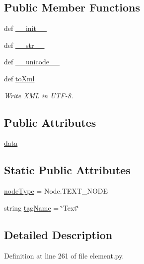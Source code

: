 \subsection*{Public Member Functions}
\begin{DoxyCompactItemize}
\item 
def \hyperlink{classodf_1_1element_1_1Text_a022dd0dc36f3ad61dfa1a497a15e7778}{\+\_\+\+\_\+init\+\_\+\+\_\+}
\item 
def \hyperlink{classodf_1_1element_1_1Text_ad8981ca5661cb6ddf5b3ec460d429850}{\+\_\+\+\_\+str\+\_\+\+\_\+}
\item 
def \hyperlink{classodf_1_1element_1_1Text_add3e46b75b09f55d21ad8a9c129fb7be}{\+\_\+\+\_\+unicode\+\_\+\+\_\+}
\item 
def \hyperlink{classodf_1_1element_1_1Text_a1b2240e8016e3833dd0651ea6d1fefb0}{to\+Xml}
\begin{DoxyCompactList}\small\item\em Write X\+M\+L in U\+T\+F-\/8. \end{DoxyCompactList}\end{DoxyCompactItemize}
\subsection*{Public Attributes}
\begin{DoxyCompactItemize}
\item 
\hyperlink{classodf_1_1element_1_1Text_a57af5961fab81e5e55bbe727bff33d3e}{data}
\end{DoxyCompactItemize}
\subsection*{Static Public Attributes}
\begin{DoxyCompactItemize}
\item 
\hyperlink{classodf_1_1element_1_1Text_ac1eb83101645ca0be4db49cf7bd20df3}{node\+Type} = Node.\+T\+E\+X\+T\+\_\+\+N\+O\+D\+E
\item 
string \hyperlink{classodf_1_1element_1_1Text_a4c8fd912194c2e0e9774c6df1d974e97}{tag\+Name} = \char`\"{}Text\char`\"{}
\end{DoxyCompactItemize}


\subsection{Detailed Description}


Definition at line 261 of file element.\+py.



